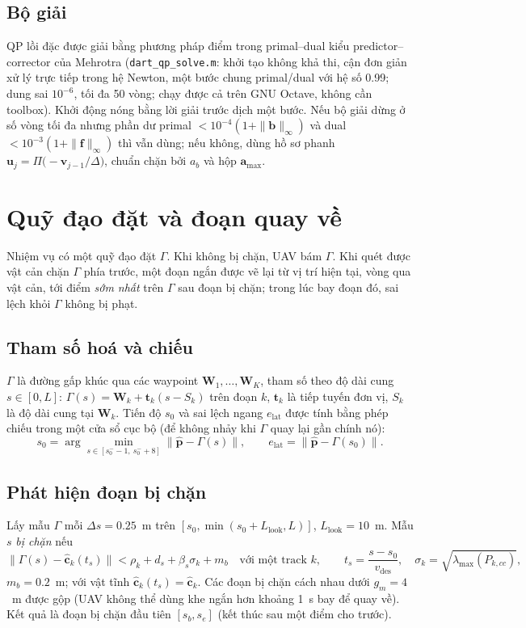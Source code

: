 \documentclass[11pt,a4paper]{article}
\numberwithin{equation}{section}
\newcommand{\vb}[1]{\bm{#1}}
\newcommand{\code}[1]{\texttt{\small #1}}
\newcommand{\lmax}{\lambda_{\max}}
\theoremstyle{definition}
\theoremstyle{plain}
\theoremstyle{remark}
\begin{document}
\subsection{Bộ giải}
\label{sec:solver}
QP lồi đặc được giải bằng phương pháp điểm trong primal--dual kiểu predictor--corrector của Mehrotra \cite{mehrotra1992} (\code{dart\_qp\_solve.m}: khởi tạo không khả thi, cận đơn giản xử lý trực tiếp trong hệ Newton, một bước chung primal/dual với hệ số 0.99; dung sai $10^{-6}$, tối đa 50 vòng; chạy được cả trên GNU Octave, không cần toolbox). Khởi động nóng bằng lời giải trước dịch một bước. Nếu bộ giải dừng ở số vòng tối đa nhưng phần dư primal $<10^{-4}(1+\|\vb b\|_\infty)$ và dual $<10^{-3}(1+\|\vb f\|_\infty)$ thì vẫn dùng; nếu không, dùng hồ sơ phanh $\vb u_j=\Pi\big(-\vb v_{j-1}/\Delta\big)$, chuẩn chặn bởi $a_b$ và hộp $\vb a_{\max}$.

\section{Quỹ đạo đặt và đoạn quay về}
\label{sec:rejoin}
Nhiệm vụ có một quỹ đạo đặt $\Gamma$. Khi không bị chặn, UAV bám $\Gamma$. Khi quét được vật cản chặn $\Gamma$ phía trước, một đoạn ngắn được vẽ lại từ vị trí hiện tại, vòng qua vật cản, tới điểm \emph{sớm nhất} trên $\Gamma$ sau đoạn bị chặn; trong lúc bay đoạn đó, sai lệch khỏi $\Gamma$ không bị phạt.

\subsection{Tham số hoá và chiếu}
$\Gamma$ là đường gấp khúc qua các waypoint $\vb W_1,\dots,\vb W_K$, tham số theo độ dài cung $s\in[0,L]$: $\Gamma(s)=\vb W_k+\vb t_k(s-S_k)$ trên đoạn $k$, $\vb t_k$ là tiếp tuyến đơn vị, $S_k$ là độ dài cung tại $\vb W_k$. Tiến độ $s_0$ và sai lệch ngang $e_{\text{lat}}$ được tính bằng phép chiếu trong một cửa sổ cục bộ (để không nhảy khi $\Gamma$ quay lại gần chính nó):
\begin{equation}
s_0=\arg\min_{s\in[s_0^{-}-1,\ s_0^{-}+8]}\|\hat{\vb p}-\Gamma(s)\|,\qquad e_{\text{lat}}=\|\hat{\vb p}-\Gamma(s_0)\|. \label{eq:proj}
\end{equation}

\subsection{Phát hiện đoạn bị chặn}
Lấy mẫu $\Gamma$ mỗi $\Delta s=0.25$~m trên $[s_0,\min(s_0+L_{\text{look}},L)]$, $L_{\text{look}}=10$~m. Mẫu $s$ \emph{bị chặn} nếu
\begin{equation}
\big\|\Gamma(s)-\hat{\vb c}_k(t_s)\big\|<\rho_k+d_s+\beta_s\sigma_k+m_b\quad\text{với một track }k,\qquad t_s=\frac{s-s_0}{v_{\text{des}}},\quad \sigma_k=\sqrt{\lmax(P_{k,cc})}, \label{eq:blocked}
\end{equation}
$m_b=0.2$~m; với vật tĩnh $\hat{\vb c}_k(t_s)=\hat{\vb c}_k$. Các đoạn bị chặn cách nhau dưới $g_m=4$~m được gộp (UAV không thể dùng khe ngắn hơn khoảng 1~s bay để quay về). Kết quả là đoạn bị chặn đầu tiên $[s_b,s_e]$ (kết thúc sau một điểm cho trước).
\end{document}
